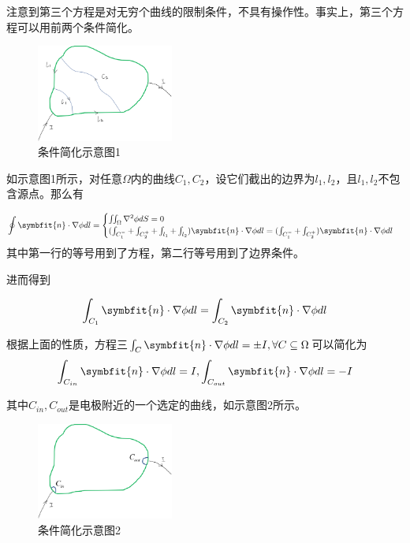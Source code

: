 \documentclass[10pt, a4paper]{article}
\newcommand\vbf{\symbfit}
\begin{document}
    注意到第三个方程是对无穷个曲线的限制条件，不具有操作性。事实上，第三个方程可以用前两个条件简化。
    
    \begin{figure}[H]
        \centering
        \includegraphics[width=0.4\textwidth]{条件简化示意图1.png}
        \caption{条件简化示意图1}\label{fig:条件简化示意图1}
    \end{figure}

    如示意图1所示，对任意$\Omega$内的曲线$C_1,C_2$，设它们截出的边界为$l_1,l_2$，且$l_1,l_2$不包含源点。那么有

    \begin{align*}
        \oint \vbf{n}\cdot\nabla\phi dl=
        \begin{cases}
            \iint_\Omega \nabla^2\phi dS=0\\
            (\int_{C_1^-}+\int_{C_2^+}+\int_{l_1}+\int_{l_2})\vbf{n}\cdot\nabla\phi dl=(\int_{C_1^-}+\int_{C_2^+})\vbf{n}\cdot\nabla\phi dl
        \end{cases}
    \end{align*}
    其中第一行的等号用到了方程，第二行等号用到了边界条件。

    进而得到

    \begin{align*}
        \int_{C_1}\vbf{n}\cdot\nabla\phi dl=\int_{C_2}\vbf{n}\cdot\nabla\phi dl
    \end{align*}

    根据上面的性质，方程三$\int_C \vbf{n} \cdot \nabla\phi  dl=\pm I,\forall C\subseteq \Omega$可以简化为
    \begin{align*}
        \int_{C_{in}} \vbf{n} \cdot \nabla\phi  dl= I, \int_{C_{out}} \vbf{n} \cdot \nabla\phi  dl= -I
    \end{align*}

    其中$C_{in},C_{out}$是电极附近的一个选定的曲线，如示意图2所示。

    \begin{figure}[H]
        \centering
        \includegraphics[width=0.4\textwidth]{条件简化示意图2.png}
        \caption{条件简化示意图2}\label{fig:条件简化示意图2}
    \end{figure}
\end{document}
